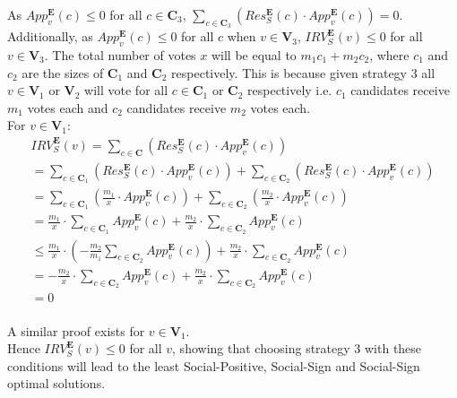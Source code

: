 \documentclass{article}
\begin{document}
As $App^{\boldsymbol{E}}_{v}(c) \leq 0$ for all $c \in \boldsymbol{C}_{3}$, $\sum^{}_{c \in \boldsymbol{C}_{3}}{(Res^{\boldsymbol{E}}_{S}(c) \cdot App^{\boldsymbol{E}}_{v}(c))}=0$. 
Additionally, as $App^{\boldsymbol{E}}_{v}(c) \leq 0$ for all $c$ when $v \in \boldsymbol{V}_{3}$, ${IRV}^{\boldsymbol{E}}_{S}(v) \leq 0$ for all $v \in \boldsymbol{V}_{3}$. 
The total number of votes $x$ will be equal to ${m}_{1}{c}_{1}+{m}_{2}{c}_{2}$, where ${c}_{1}$ and ${c}_{2}$ are the sizes of $\boldsymbol{C}_{1}$ and $\boldsymbol{C}_{2}$ respectively. This is because given strategy 3 all $v \in \boldsymbol{V}_{1}$ or $\boldsymbol{V}_{2}$ will vote for all $c \in \boldsymbol{C}_{1}$ or $\boldsymbol{C}_{2}$ respectively i.e. ${c}_{1}$ candidates receive ${m}_{1}$ votes each and ${c}_{2}$ candidates receive ${m}_{2}$ votes each.\\
For $v \in \boldsymbol{V}_{1}$:
\begin{equation}
\begin{split}
    {IRV}^{\boldsymbol{E}}_{S}(v) = \sum^{}_{c \in \boldsymbol{C}}{(Res^{\boldsymbol{E}}_{S}(c) \cdot App^{\boldsymbol{E}}_{v}(c))}\\
    = \sum^{}_{c \in \boldsymbol{C}_{1}}{(Res^{\boldsymbol{E}}_{S}(c) \cdot App^{\boldsymbol{E}}_{v}(c))}+\sum^{}_{c \in \boldsymbol{C}_{2}}{(Res^{\boldsymbol{E}}_{S}(c) \cdot App^{\boldsymbol{E}}_{v}(c))}\\
    = \sum^{}_{c \in \boldsymbol{C}_{1}}{(\frac{{m}_{1}}{x} \cdot App^{\boldsymbol{E}}_{v}(c))}+\sum^{}_{c \in \boldsymbol{C}_{2}}{(\frac{{m}_{2}}{x} \cdot App^{\boldsymbol{E}}_{v}(c))}\\
    = \frac{{m}_{1}}{x} \cdot \sum^{}_{c \in \boldsymbol{C}_{1}}{App^{\boldsymbol{E}}_{v}(c)}+\frac{{m}_{2}}{x} \cdot \sum^{}_{c \in \boldsymbol{C}_{2}}{App^{\boldsymbol{E}}_{v}(c)}\\
    \leq \frac{{m}_{1}}{x} \cdot (-\frac{{m}_{2}}{{m}_{1}}\sum^{}_{c \in \boldsymbol{C}_{2}}{App^{\boldsymbol{E}}_{v}(c)})+\frac{{m}_{2}}{x} \cdot \sum^{}_{c \in \boldsymbol{C}_{2}}{App^{\boldsymbol{E}}_{v}(c)}\\
    = -\frac{{m}_{2}}{x} \cdot \sum^{}_{c \in \boldsymbol{C}_{2}}{App^{\boldsymbol{E}}_{v}(c)}+\frac{{m}_{2}}{x} \cdot \sum^{}_{c \in \boldsymbol{C}_{2}}{App^{\boldsymbol{E}}_{v}(c)}\\
    = 0
\end{split}     
\end{equation}\\

A similar proof exists for $v \in \boldsymbol{V}_{1}$.\\
Hence ${IRV}^{\boldsymbol{E}}_{S}(v) \leq 0$ for all $v$, showing that choosing strategy 3 with these conditions will lead to the least Social-Positive, Social-Sign and Social-Sign optimal solutions. 
\end{document}
